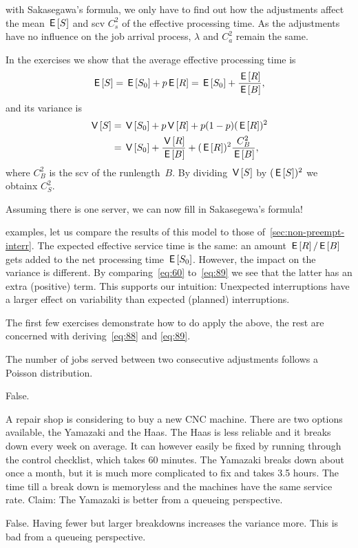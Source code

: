 \documentclass[stochastic-or.tex]{subfiles}
\begin{document}
 with Sakasegawa's formula, we only have to find out how the adjustments affect the  mean $\,\mathsf{E}\left[S\right]$ and scv $C_s^2$ of the effective processing time.
As the adjustments have no influence on the job arrival process, $\lambda$ and $C_a^{2}$ remain the same.

In the exercises we show that the average effective processing time is
\begin{equation} \label{eq:88}
 \,\mathsf{E}\left[S\right] = \,\mathsf{E}\left[S_0\right] + p \,\mathsf{E}\left[R\right] = \,\mathsf{E}\left[S_0\right] + \frac{\,\mathsf{E}\left[R\right]}{\,\mathsf{E}\left[B\right]},
\end{equation}
and its  variance is
\begin{equation}\label{eq:89}
  \begin{split}
 \,\mathsf{V}\left[S\right]
&= \,\mathsf{V}\left[S_0\right] + p\,\mathsf{V}\left[R\right] + p (1-p)(\,\mathsf{E}\left[R\right])^2 \\
&= \,\mathsf{V}\left[S_0\right] + \frac{\,\mathsf{V}\left[R\right]}{\,\mathsf{E}\left[B\right]} + (\,\mathsf{E}\left[R\right])^2\frac{C_B^2}{\,\mathsf{E}\left[B\right]},
 \end{split}
\end{equation}
where $C_B^2$ is the scv of the runlength~$B$.
By dividing $\,\mathsf{V}\left[S\right]$ by $(\,\mathsf{E}\left[S\right])^{2}$ we obtainx $C_{S}^{2}$.

Assuming there is one server,  we can now  fill in Sakasegewa's formula!


 examples, let us compare the results of this model to those of~\cref{sec:non-preempt-interr}.
The expected effective service time is the same: an amount $\,\mathsf{E}\left[R\right]/ \,\mathsf{E}\left[B\right]$ gets added to the net processing time $\,\mathsf{E}\left[S_0\right]$.
However, the impact on the variance is different.
By comparing~\cref{eq:60} to~\cref{eq:89} we see that the latter has an extra (positive) term.
This supports our intuition: Unexpected interruptions have a larger effect on variability than expected (planned) interruptions.

The first few exercises demonstrate how to do apply the above, the rest are concerned with deriving~\cref{eq:88} and \cref{eq:89}.

\begin{truefalse}
    The number of jobs served between two consecutive adjustments follows a Poisson distribution.
\begin{solution}
        False.
\end{solution}
\end{truefalse}

\begin{truefalse}
A repair shop is considering to buy a new CNC machine.
There are two options available, the Yamazaki and the Haas.
The Haas is less reliable and it breaks down every week on average.
It can however easily be fixed by running through the control checklist, which takes 60 minutes.
The Yamazaki breaks down about once a month, but it is much more complicated to fix and takes 3.5 hours.
The time till a break down is memoryless and the machines have the same service rate.
Claim: The Yamazaki is better from a queueing perspective.
\begin{solution}
        False. Having fewer but larger breakdowns increases the variance more. This is bad from a queueing perspective.
\end{solution}
\end{truefalse}
\end{document}
